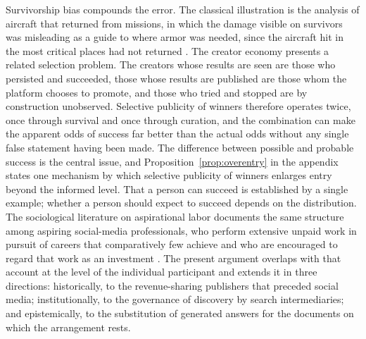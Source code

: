 \documentclass[11pt]{article}
\theoremstyle{remark}
\begin{document}
Survivorship bias compounds the error. The classical illustration is the analysis of aircraft that returned from missions, in which the damage visible on survivors was misleading as a guide to where armor was needed, since the aircraft hit in the most critical places had not returned \cite{mangel1984}. The creator economy presents a related selection problem. The creators whose results are seen are those who persisted and succeeded, those whose results are published are those whom the platform chooses to promote, and those who tried and stopped are by construction unobserved. Selective publicity of winners therefore operates twice, once through survival and once through curation, and the combination can make the apparent odds of success far better than the actual odds without any single false statement having been made. The difference between possible and probable success is the central issue, and Proposition~\ref{prop:overentry} in the appendix states one mechanism by which selective publicity of winners enlarges entry beyond the informed level. That a person can succeed is established by a single example; whether a person should expect to succeed depends on the distribution. The sociological literature on aspirational labor documents the same structure among aspiring social-media professionals, who perform extensive unpaid work in pursuit of careers that comparatively few achieve and who are encouraged to regard that work as an investment \cite{duffy2017}. The present argument overlaps with that account at the level of the individual participant and extends it in three directions: historically, to the revenue-sharing publishers that preceded social media; institutionally, to the governance of discovery by search intermediaries; and epistemically, to the substitution of generated answers for the documents on which the arrangement rests.
\end{document}
